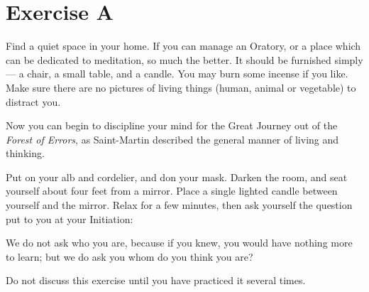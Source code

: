 \chapter{Exercise A}
Find a quiet space in your home. If you can manage an Oratory, or a place which can be
dedicated to meditation, so much the better. It should be furnished simply --– a chair, a small
table, and a candle. You may burn some incense if you like. Make sure there are no pictures of
living things (human, animal or vegetable) to distract you.

Now you can begin to discipline your mind for the Great Journey out of the \textit{Forest of Errors}, as
Saint-Martin described the general manner of living and thinking.

Put on your alb and cordelier, and don your mask. Darken the room, and seat yourself about four
feet from a mirror. Place a single lighted candle between yourself and the mirror. Relax for a
few minutes, then ask yourself the question put to you at your Initiation:

\begin{quotebox}
    We do not ask who you are, because if you knew, you would have nothing more to learn; but
we do ask you whom do you think you are?
\end{quotebox}

Do not discuss this exercise until you have practiced it several times.


